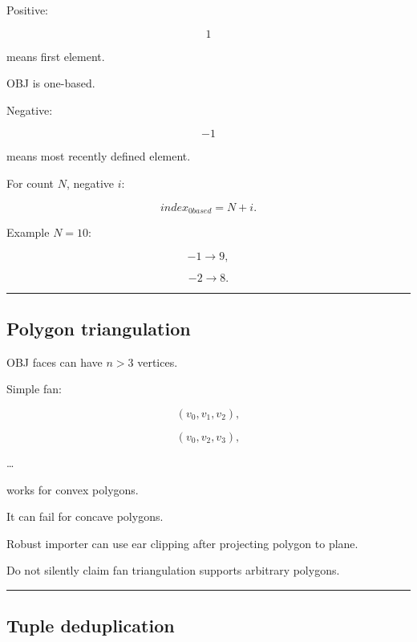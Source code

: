 \hypertarget{04-visual-computing-ii-ch041-obj-negative-indices}{}

Positive:

\[
1
\]

means first element.

OBJ is one-based.

Negative:

\[
-1
\]

means most recently defined element.

For count \(N\), negative \(i\):

\[
\boxed{
index_{0based}
=
N+i.
}
\]

Example \(N=10\):

\[
-1\rightarrow9,
\]

\[
-2\rightarrow8.
\]

\begin{center}\rule{0.5\linewidth}{0.5pt}\end{center}

\subsection{Polygon triangulation}\label{04-visual-computing-ii-ch041-polygon-triangulation}

\hypertarget{04-visual-computing-ii-ch041-polygon-triangulation}{}

OBJ faces can have \(n>3\) vertices.

Simple fan:

\[
(v_0,v_1,v_2),
\]

\[
(v_0,v_2,v_3),
\]

\ldots{}

works for convex polygons.

It can fail for concave polygons.

Robust importer can use ear clipping after projecting polygon to plane.

Do not silently claim fan triangulation supports arbitrary polygons.

\begin{center}\rule{0.5\linewidth}{0.5pt}\end{center}

\subsection{Tuple deduplication}\label{04-visual-computing-ii-ch041-tuple-deduplication}

\hypertarget{04-visual-computing-ii-ch041-tuple-deduplication}{}


